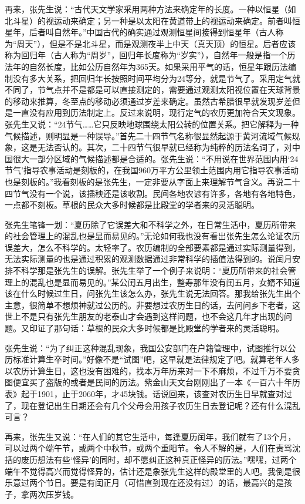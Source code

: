 再来，张先生说：“古代天文学家采用两种方法来确定年的长度。一种以恒星（如北斗星）的视运动来确定；另一种是以太阳在黄道带上的视运动来确定。前者叫恒星年，后者叫自然年。”中国古代的确实通过观测恒星间接得到恒星年（古人称为“周天”），但是不是北斗星，而是观测夜半上中天（真天顶）的恒星。后者应该称为回归年（古人称为“周岁”，回归年长度称为“岁实”），自然年一般是指一个历法年的自然长度，比如公历自然年为365天。如果采用平气的话，恒星年跟历法编制没有多大关系，把回归年长按照时间平均分为24等分，就是节气了。采用定气就不同了，节气点并不是都是可以直接测定的，需要通过观测太阳视位置在天球背景的移动来推算，冬至点的移动必须通过岁差来确定。虽然古希腊很早就发现岁差但是一直没有应用到历法制定上。反过来说明，现行定气的农历更加符合天文现象。张先生又说：“24节气……它只反映地球围绕太阳公转的位置关系。把它解释为一种气候描述，则明显是一种误导。”首先二十四节气名称很显然起源于黄河流域气候现象，这是无法否认的。其次，二十四节气很早就已经称为纯粹的历法名词了，对中国很大一部分区域的气候描述都是合适的。张先生说：“不用说在世界范围内用‘24节气’指导农事活动是刻板的，在我国960万平方公里领土范围内用它指导农事活动也是刻板的。”我看刻板的是张先生，一定非要从字面上来理解节气含义。再说二十四节气没有一个说，该插秧还是该收割。民间各地农谚有许多，各地有各地特色，一点都不刻板。草根的民众大多时候都是比殿堂的学者来的灵活聪明。

张先生笔锋一划：“夏历除了它误差大和不科学之外，在日常生活中，夏历所带来的社会管理上的混乱也是显而易见的。”无论如何我也没有看出张先生怎么论证农历误差大，怎么不科学的。太轻率了。农历编制的全部要素都是通过实际测量得到，无法实际测量的也是通过积累的观测数据通过非常科学的插值法得到的。说闰月安排不科学那是张先生的误解。张先生举了一个例子来说明：“夏历所带来的社会管理上的混乱也是显而易见的。”某公闰五月出生，整寿那年没有闰五月，女婿不知道该在什么时候过生日，问张先生该怎么办，张先生说无法回答。那我给张先生出个主意，很简单不想烦神就过公历的。非要想过农历生日的话，去问问乡下老者，这世上不是只有张先生朋友的老泰山才会遇到这样问题，也不会这几年才出现的问题。又印证了那句话：草根的民众大多时候都是比殿堂的学者来的灵活聪明。

张先生说：“为了纠正这种混乱现象，我国公安部门在户籍管理中，试图推行以公历标准计算生卒时间。”好像不是“试图”吧，这早就是法律规定了吧。就算老年人多以农历计算生日，这也没有困难的，找本万年历来对一下不麻烦，不过千万不要贪图便宜买了盗版的或者是民间的历法。紫金山天文台刚刚出了一本《一百六十年历表》起于1901，止于2060年，才45块钱。话说回来，该查对农历生日早就查对过了，现在登记出生日期还会有几个父母会用孩子农历生日去登记呢？还有什么混乱可言？

再来，张先生又说：“在人们的其它生活中，每逢夏历闰年，我们就有了13个月，可以过两个端午节，或两个中秋节，或两个重阳节。令人不解的是，人们在责骂沈括的废历想法有些‘怪异’的同时，却不愿纠正这种真正怪异的历法。”嘿嘿，过两个端午不觉得高兴而觉得怪异的，估计还是象张先生这样的殿堂里的人吧。我倒是很乐意过两个节日。要是有闰正月（可惜直到现在还没有过）的话，最高兴的是孩子，拿两次压岁钱。

